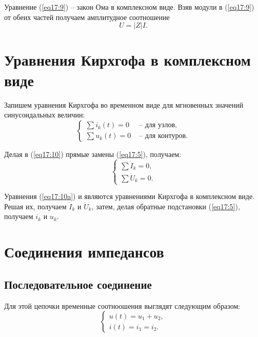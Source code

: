     Уравнение (\ref{eq17:9}) -- закон Ома в комплексном виде. Взяв модули в
     (\ref{eq17:9}) от обеих частей получаем амплитудное соотношение
    \[
        U = |Z|I.
    \]
    
\section{Уравнения Кирхгофа в комплексном виде}

    Запишем уравнения Кирхгофа во временном виде для мгновенных значений
    синусоидальных величин:
    \begin{equation}
        \left\{
        \begin{array}{ll}
            \sum i_k(t) = 0 & \text{ -- для узлов}, \\
            \sum u_k(t) = 0 & \text{ -- для контуров}.
        \end{array}
        \right.
        \label{eq17:10}
    \end{equation}
    
    Делая в (\ref{eq17:10}) прямые замены (\ref{eq17:5}), получаем:
    \begin{equation}
        \left\{
        \begin{array}{l}
            \sum \dot{I}_k = 0, \\
            \sum \dot{U}_k = 0.
        \end{array}
        \right.
        \label{eq17:10a}
    \end{equation}
    
    Уравнения (\ref{eq17:10a}) и являются уравнениями Кирхгофа в комплексном
    виде. Решая их, получаем \( \dot{I}_k \) и \( \dot{U}_k \), затем, делая
    обратные подстановки (\ref{eq17:5}), получаем \( i_k \) и \( u_k \).
    
\section{Соединения импедансов}
    \subsection{Последовательное соединение}
        Для этой цепочки временные соотноошения выглядят следующим образом:
        \[
            \left\{
            \begin{array}{l}
                u(t) = u_1 + u_2, \\
                i(t) = i_1 = i_2.
            \end{array}
            \right.
        \]

